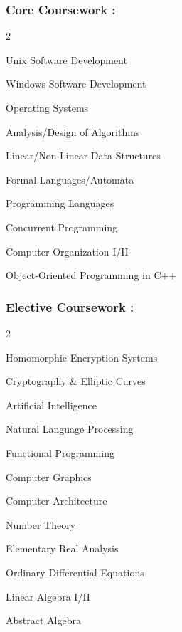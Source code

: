 \documentclass{article}
\newenvironment{mylist}[2]{
  \subsubsection*{#1}
  \begin{multicols}{#2}
  \small
  \begin{list}{}{}
   \setlength{\topsep}{0pt}
   \setlength{\itemsep}{1pt}
   \setlength{\parskip}{0pt}
   \setlength{\parsep}{0pt}}{\end{list}\end{multicols}\normalsize}
\begin{document}
\begin{mylist}{Core Coursework :}{2}
\item Unix Software Development
\item Windows Software Development
\item Operating Systems
\item Analysis/Design of Algorithms
\item Linear/Non-Linear Data Structures
\item Formal Languages/Automata
\item Programming Languages
\item Concurrent Programming
\item Computer Organization I/II
\item Object-Oriented Programming in C++
\end{mylist}

\begin{mylist}{Elective Coursework :}{2} 
\item Homomorphic Encryption Systems
\item Cryptography \& Elliptic Curves 
\item Artificial Intelligence 
\item Natural Language Processing 
\item Functional Programming
\item Computer Graphics
\item Computer Architecture 
\item Number Theory 
\item Elementary Real Analysis 
\item Ordinary Differential Equations 
\item Linear Algebra I/II 
\item Abstract Algebra 
\end{mylist}
\end{document}
